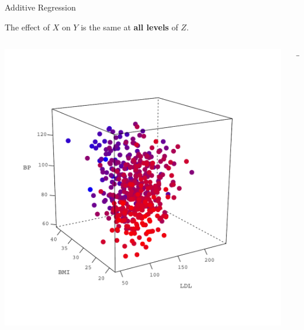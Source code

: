 \documentclass{beamer}\usepackage[]{graphicx}\usepackage[]{color}
\begin{document}
\begin{frame}{Additive Regression}
  
  The effect of $X$ on $Y$ is the same at \textbf{all levels} of $Z$.
  
  \begin{columns}
    \begin{column}{0.45\textwidth}
      \includegraphics[width = 1.1\textwidth]{figures/3d_data_plot}
    \end{column}
    
    \begin{column}{0.1\textwidth}
      \begin{center}\Huge{$\rightarrow$}\end{center}
    \end{column}
    

\end{columns}
\end{frame}
\end{document}
